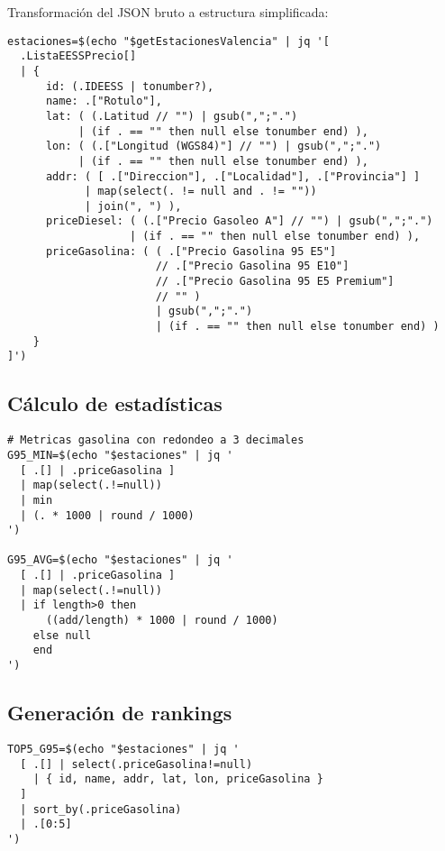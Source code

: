 Transformación del JSON bruto a estructura simplificada:

\begin{lstlisting}[style=bash,caption={Transformación JSON}]
estaciones=$(echo "$getEstacionesValencia" | jq '[
  .ListaEESSPrecio[]
  | {
      id: (.IDEESS | tonumber?),
      name: .["Rotulo"],
      lat: ( (.Latitud // "") | gsub(",";".") 
           | (if . == "" then null else tonumber end) ),
      lon: ( (.["Longitud (WGS84)"] // "") | gsub(",";".") 
           | (if . == "" then null else tonumber end) ),
      addr: ( [ .["Direccion"], .["Localidad"], .["Provincia"] ] 
            | map(select(. != null and . != "")) 
            | join(", ") ),
      priceDiesel: ( (.["Precio Gasoleo A"] // "") | gsub(",";".") 
                   | (if . == "" then null else tonumber end) ),
      priceGasolina: ( ( .["Precio Gasolina 95 E5"]
                       // .["Precio Gasolina 95 E10"]
                       // .["Precio Gasolina 95 E5 Premium"]
                       // "" )
                       | gsub(",";".") 
                       | (if . == "" then null else tonumber end) )
    }
]')
\end{lstlisting}

\subsection{Cálculo de estadísticas}

\begin{lstlisting}[style=bash,caption={Estadísticas de precios}]
# Metricas gasolina con redondeo a 3 decimales
G95_MIN=$(echo "$estaciones" | jq '
  [ .[] | .priceGasolina ] 
  | map(select(.!=null)) 
  | min 
  | (. * 1000 | round / 1000)
')

G95_AVG=$(echo "$estaciones" | jq '
  [ .[] | .priceGasolina ] 
  | map(select(.!=null)) 
  | if length>0 then 
      ((add/length) * 1000 | round / 1000) 
    else null 
    end
')
\end{lstlisting}

\subsection{Generación de rankings}

\begin{lstlisting}[style=bash,caption={Top 5 más baratas}]
TOP5_G95=$(echo "$estaciones" | jq '
  [ .[] | select(.priceGasolina!=null) 
    | { id, name, addr, lat, lon, priceGasolina } 
  ] 
  | sort_by(.priceGasolina) 
  | .[0:5]
')
\end{lstlisting}

